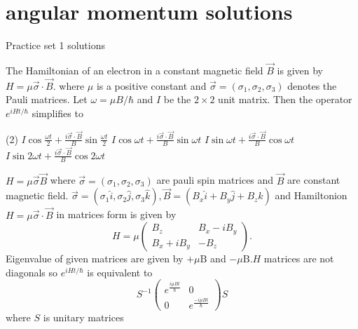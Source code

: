 \chapter{angular momentum solutions}
\begin{abox}
	Practice set 1 solutions
	\end{abox}
\begin{enumerate}
	\begin{minipage}{\textwidth}
		\item The Hamiltonian of an electron in a constant magnetic field $\vec{B}$ is given by $H=\mu \vec{\sigma} \cdot \vec{B}$. where $\mu$ is a positive constant and $\vec{\sigma}=\left(\sigma_{1}, \sigma_{2}, \sigma_{3}\right)$ denotes the Pauli matrices. Let $\omega=\mu B / \hbar$ and $I$ be the $2 \times 2$ unit matrix. Then the operator $e^{i H t / \hbar}$ simplifies to
	\end{minipage}
	\begin{tasks}(2)
		\task[\textbf{A.}] $I \cos \frac{\omega t}{2}+\frac{i \vec{\sigma} \cdot \vec{B}}{B} \sin \frac{\omega t}{2}$
		\task[\textbf{B.}]$I \cos \omega t+\frac{i \vec{\sigma} \cdot \vec{B}}{B} \sin \omega t$
		\task[\textbf{C.}]$I \sin \omega t+\frac{i \vec{\sigma} \cdot \vec{B}}{B} \cos \omega t$
		\task[\textbf{D.}]$I \sin 2 \omega t+\frac{i \vec{\sigma} \cdot \vec{B}}{B} \cos 2 \omega t$
	\end{tasks}
\begin{answer}
	$H=\mu \vec{\sigma} \vec{B}$ where $\vec{\sigma}=\left(\sigma_{1}, \sigma_{2}, \sigma_{3}\right)$ are pauli spin matrices and $\vec{B}$ are constant magnetic field. $\vec{\sigma}=\left(\sigma_{1} \hat{i}, \sigma_{2} \hat{j}, \sigma_{3} \hat{k}\right), \vec{B}=\left(B_{x} \hat{i}+B_{y} \hat{j}+B_{z} \hat{k}\right)$ and Hamiltonion $H=\mu \vec{\sigma} \cdot \vec{B}$ in matrices form is given by
	$$
	H=\mu\left(\begin{array}{cc}
	B_{z} & B_{x}-i B_{y} \\
	B_{x}+i B_{y} & -B_{z}
	\end{array}\right) .
	$$
	Eigenvalue of given matrices are given by $+\mu \mathrm{B}$ and $-\mu \mathrm{B} . H$ matrices are not diagonals so $e^{i H t / \hbar}$ is equivalent to
	$$
	S^{-1}\left(\begin{array}{cc}
	e^{\frac{i \mu B t}{\hbar}} & 0 \\
	0 & e^{\frac{-i \mu B t}{\hbar}}
	\end{array}\right) S
	$$
	where $S$ is unitary matrices\\

\end{answer}
\end{enumerate}
